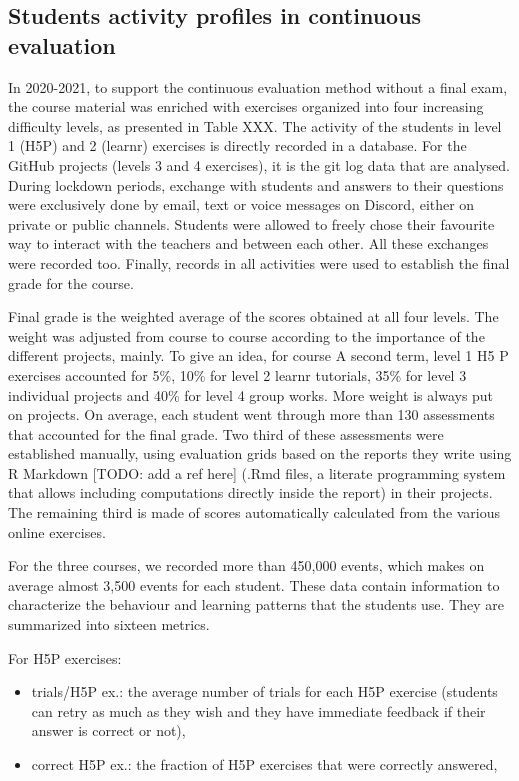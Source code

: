 \documentclass{aims}
\theoremstyle{definition}
\providecommand{\tightlist}{%
  \setlength{\itemsep}{0pt}\setlength{\parskip}{0pt}}
\begin{document}
\hypertarget{students-activity-profiles-in-continuous-evaluation}{%
\subsection{Students activity profiles in continuous
evaluation}\label{students-activity-profiles-in-continuous-evaluation}}

In 2020-2021, to support the continuous evaluation method without a
final exam, the course material was enriched with exercises organized
into four increasing difficulty levels, as presented in Table XXX. The
activity of the students in level 1 (H5P) and 2 (learnr) exercises is
directly recorded in a database. For the GitHub projects (levels 3 and 4
exercises), it is the git log data that are analysed. During lockdown
periods, exchange with students and answers to their questions were
exclusively done by email, text or voice messages on Discord, either on
private or public channels. Students were allowed to freely chose their
favourite way to interact with the teachers and between each other. All
these exchanges were recorded too. Finally, records in all activities
were used to establish the final grade for the course.

Final grade is the weighted average of the scores obtained at all four
levels. The weight was adjusted from course to course according to the
importance of the different projects, mainly. To give an idea, for
course A second term, level 1 H5 P exercises accounted for 5\%, 10\% for
level 2 learnr tutorials, 35\% for level 3 individual projects and 40\%
for level 4 group works. More weight is always put on projects. On
average, each student went through more than 130 assessments that
accounted for the final grade. Two third of these assessments were
established manually, using evaluation grids based on the reports they
write using R Markdown {[}TODO: add a ref here{]} (.Rmd files, a
literate programming system that allows including computations directly
inside the report) in their projects. The remaining third is made of
scores automatically calculated from the various online exercises.

For the three courses, we recorded more than 450,000 events, which makes
on average almost 3,500 events for each student. These data contain
information to characterize the behaviour and learning patterns that the
students use. They are summarized into sixteen metrics.

For H5P exercises:

\begin{itemize}
\tightlist
\item
  trials/H5P ex.: the average number of trials for each H5P exercise
  (students can retry as much as they wish and they have immediate
  feedback if their answer is correct or not),
\item
  correct H5P ex.: the fraction of H5P exercises that were correctly
  answered,
\end{itemize}
\end{document}
